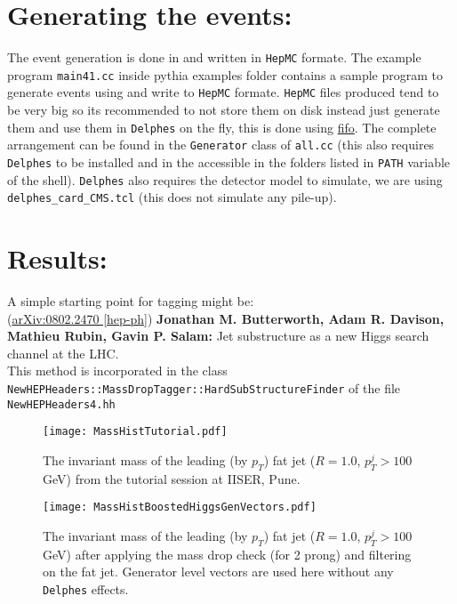 \section{Generating the events:}
The event generation is done in {\pyth} and written in {\tt HepMC} formate.
The example program {\tt main41.cc} inside pythia examples folder contains a sample program to generate events using {\pyth} and write to {\tt HepMC} formate.
{\tt HepMC} files produced tend to be very big so its recommended to not store them on disk instead just generate them and use them in {\tt Delphes} on the fly, this is done using \href{http://man7.org/linux/man-pages/man7/fifo.7.html}{fifo}.
The complete arrangement can be found in the {\tt Generator} class of {\tt all.cc} (this also requires {\tt Delphes} to be installed and in the accessible in the folders listed in {\tt PATH} variable of the shell). {\tt Delphes} also requires the detector model to simulate, we are using  {\tt delphes\_card\_CMS.tcl} (this does not simulate any pile-up).

\section{Results:}

A simple starting point for tagging might be:\\
(\href{https://arxiv.org/pdf/0802.2470.pdf}{arXiv:0802.2470 [hep-ph]}) {\bf Jonathan M. Butterworth, Adam R. Davison, Mathieu Rubin, Gavin P. Salam:} Jet substructure as a new Higgs search channel at the LHC.\\
This method is incorporated in the class {\tt NewHEPHeaders::MassDropTagger::HardSubStructureFinder} of the file {\tt NewHEPHeaders4.hh}

\begin{figure}
	\begin{center}
		\texttt{[image: MassHistTutorial.pdf]}
		\caption{
			The invariant mass of the leading (by $p_T$) fat jet ($R=1.0$, $p_T^{j}>100$ GeV) from the tutorial session at IISER, Pune.
		}
	\end{center}
\end{figure}

\begin{figure}
	\begin{center}
		\texttt{[image: MassHistBoostedHiggsGenVectors.pdf]}
		\caption{
			The invariant mass of the leading (by $p_T$) fat jet ($R=1.0$, $p_T^{j}>100$ GeV) after applying the mass drop check (for 2 prong) and filtering on the fat jet. Generator level vectors are used here without any {\tt Delphes} effects.
		}
	\end{center}
\end{figure}


